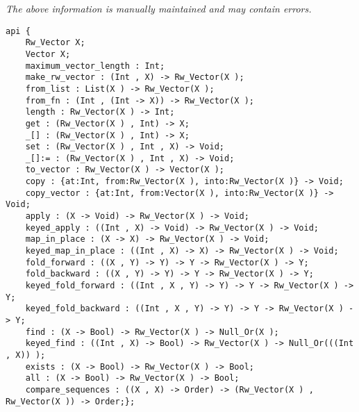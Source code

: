 \label{api:Rw\_Vector}

{\tiny \it The above information is manually maintained and may contain errors.}
\begin{verbatim}
api {
    Rw_Vector X;
    Vector X;
    maximum_vector_length : Int;
    make_rw_vector : (Int , X) -> Rw_Vector(X );
    from_list : List(X ) -> Rw_Vector(X );
    from_fn : (Int , (Int -> X)) -> Rw_Vector(X );
    length : Rw_Vector(X ) -> Int;
    get : (Rw_Vector(X ) , Int) -> X;
    _[] : (Rw_Vector(X ) , Int) -> X;
    set : (Rw_Vector(X ) , Int , X) -> Void;
    _[]:= : (Rw_Vector(X ) , Int , X) -> Void;
    to_vector : Rw_Vector(X ) -> Vector(X );
    copy : {at:Int, from:Rw_Vector(X ), into:Rw_Vector(X )} -> Void;
    copy_vector : {at:Int, from:Vector(X ), into:Rw_Vector(X )} -> Void;
    apply : (X -> Void) -> Rw_Vector(X ) -> Void;
    keyed_apply : ((Int , X) -> Void) -> Rw_Vector(X ) -> Void;
    map_in_place : (X -> X) -> Rw_Vector(X ) -> Void;
    keyed_map_in_place : ((Int , X) -> X) -> Rw_Vector(X ) -> Void;
    fold_forward : ((X , Y) -> Y) -> Y -> Rw_Vector(X ) -> Y;
    fold_backward : ((X , Y) -> Y) -> Y -> Rw_Vector(X ) -> Y;
    keyed_fold_forward : ((Int , X , Y) -> Y) -> Y -> Rw_Vector(X ) -> Y;
    keyed_fold_backward : ((Int , X , Y) -> Y) -> Y -> Rw_Vector(X ) -> Y;
    find : (X -> Bool) -> Rw_Vector(X ) -> Null_Or(X );
    keyed_find : ((Int , X) -> Bool) -> Rw_Vector(X ) -> Null_Or(((Int , X)) );
    exists : (X -> Bool) -> Rw_Vector(X ) -> Bool;
    all : (X -> Bool) -> Rw_Vector(X ) -> Bool;
    compare_sequences : ((X , X) -> Order) -> (Rw_Vector(X ) , Rw_Vector(X )) -> Order;};
\end{verbatim}
\index[fun]{\_[]:=}
\index[fun]{\_[]}
